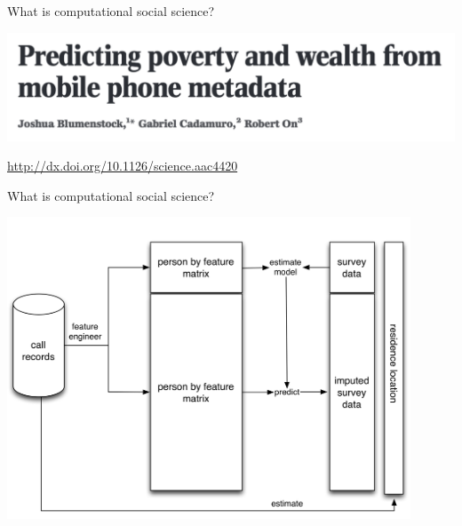 \documentclass{beamer}
\def\vf{\vfill}
\begin{document}
\begin{frame}{What is computational social science?}

\begin{center}
\includegraphics[width=1\textwidth]{figures/blumenstock_predicting_2015_title}
\end{center}

\vf
\tiny{\textcolor{blue}{\url{http://dx.doi.org/10.1126/science.aac4420}}}

\end{frame}
\begin{frame}{What is computational social science?}

\begin{center}

\includegraphics[width=0.9\textwidth]{figures/blumenstock_predicting_2015_schematic_6}
\end{center}

\end{frame}
\end{document}
